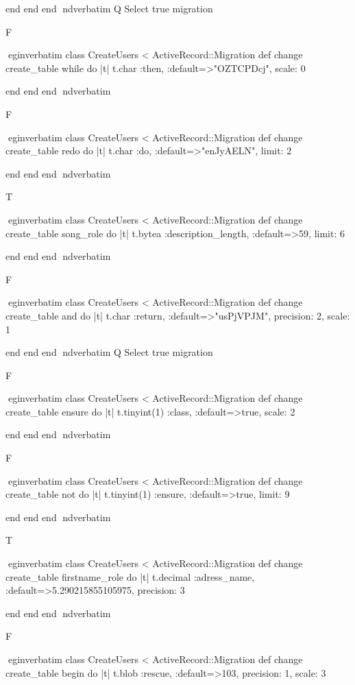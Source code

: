     end 
  end 
end
nd{verbatim}
Q
 Select true migration

F

egin{verbatim}
 class CreateUsers < ActiveRecord::Migration 
  def change 
    create_table while do |t| 
      t.char :then, :default=>"OZTCPDcj", scale: 0
    
    end 
  end 
end
nd{verbatim}

F

egin{verbatim}
 class CreateUsers < ActiveRecord::Migration 
  def change 
    create_table redo do |t| 
      t.char :do, :default=>"enJyAELN", limit: 2
    
    end 
  end 
end
nd{verbatim}

T

egin{verbatim}
 class CreateUsers < ActiveRecord::Migration 
  def change 
    create_table song_role do |t| 
      t.bytea :description_length, :default=>59, limit: 6
    
    end 
  end 
end
nd{verbatim}

F

egin{verbatim}
 class CreateUsers < ActiveRecord::Migration 
  def change 
    create_table and do |t| 
      t.char :return, :default=>"usPjVPJM", precision: 2, scale: 1
    
    end 
  end 
end
nd{verbatim}
Q
 Select true migration

F

egin{verbatim}
 class CreateUsers < ActiveRecord::Migration 
  def change 
    create_table ensure do |t| 
      t.tinyint(1) :class, :default=>true, scale: 2
    
    end 
  end 
end
nd{verbatim}

F

egin{verbatim}
 class CreateUsers < ActiveRecord::Migration 
  def change 
    create_table not do |t| 
      t.tinyint(1) :ensure, :default=>true, limit: 9
    
    end 
  end 
end
nd{verbatim}

T

egin{verbatim}
 class CreateUsers < ActiveRecord::Migration 
  def change 
    create_table firstname_role do |t| 
      t.decimal :adress_name, :default=>5.290215855105975, precision: 3
    
    end 
  end 
end
nd{verbatim}

F

egin{verbatim}
 class CreateUsers < ActiveRecord::Migration 
  def change 
    create_table begin do |t| 
      t.blob :rescue, :default=>103, precision: 1, scale: 3
    
